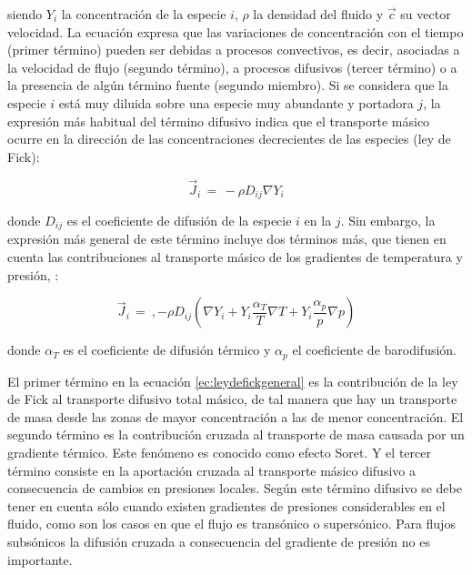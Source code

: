 siendo  $Y_i$ la concentración de la especie $i$,  $\rho$ la densidad del fluido y  $\vec{c}$ su vector velocidad. La ecuación expresa que las variaciones de concentración con el tiempo (primer término) pueden ser debidas a procesos convectivos, es decir, asociadas a la velocidad de flujo (segundo término), a procesos difusivos (tercer término) o a la presencia de algún término fuente (segundo miembro). Si se considera que la especie $i$ está muy diluida sobre una especie muy abundante y portadora $j$, la expresión más habitual del término difusivo indica que el transporte másico ocurre en la dirección de las concentraciones decrecientes de las especies (ley de Fick):

\begin{equation}
\label{ec:leydefick}
\vec{J}_i\,=\,-\rho D_{ij} \nabla Y_i
\end{equation}

donde  $D_{ij}$ es el coeficiente de difusión de la especie $i$ en la $j$. Sin embargo, la expresión más general de este término incluye dos términos más, que tienen en cuenta las contribuciones al transporte másico de los gradientes de temperatura y presión, \cite{landauetal:1987}:

\begin{equation}
\label{ec:leydefickgeneral}
\vec{J}_i\,=\ ,- \rho D_{ij} \left( \nabla Y_i + Y_i \frac{\alpha_T}{T} \nabla T + Y_i \frac{\alpha_p}{p} \nabla p \right)
\end{equation}

donde  $\alpha_T$ es el  coeficiente de difusión térmico y  $\alpha_p$ el  coeficiente de barodifusión.

\par El primer término en la ecuación \ref{ec:leydefickgeneral} es la contribución de la ley de Fick al transporte difusivo total másico, de tal manera que hay un transporte de masa desde las zonas de mayor concentración a las de menor concentración. El segundo término es la contribución cruzada al transporte de masa causada por un gradiente térmico. Este fenómeno es conocido como  efecto Soret. Y el tercer término consiste en la aportación cruzada al transporte másico difusivo a consecuencia de cambios en presiones locales. Según \cite{landauetal:1987} este término difusivo se debe tener en cuenta sólo cuando existen gradientes de presiones considerables en el fluido, como son los casos en que el flujo es transónico o supersónico. Para flujos subsónicos la difusión cruzada a consecuencia del gradiente de presión no es importante.

